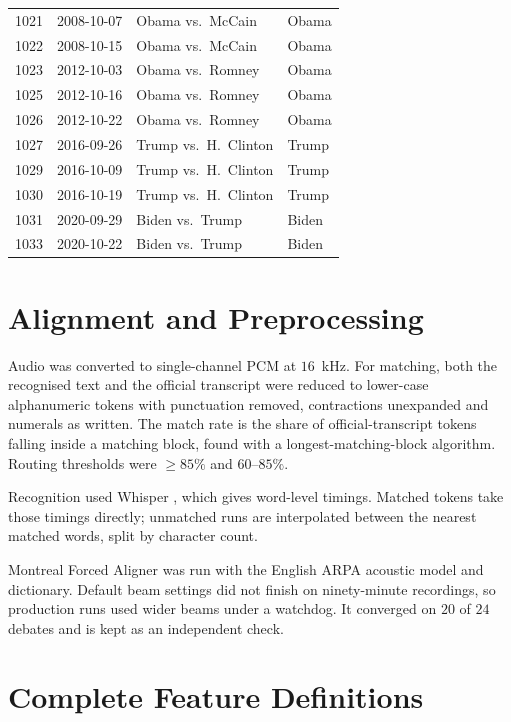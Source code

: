 \documentclass[journal]{IEEEtran}
\begin{document}
\begin{table}[h]
\begin{tabular}{llp{}l}
1021 & 2008-10-07 & Obama vs.\ McCain & Obama \\
1022 & 2008-10-15 & Obama vs.\ McCain & Obama \\
1023 & 2012-10-03 & Obama vs.\ Romney & Obama \\
1025 & 2012-10-16 & Obama vs.\ Romney & Obama \\
1026 & 2012-10-22 & Obama vs.\ Romney & Obama \\
1027 & 2016-09-26 & Trump vs.\ H.\ Clinton & Trump \\
1029 & 2016-10-09 & Trump vs.\ H.\ Clinton & Trump \\
1030 & 2016-10-19 & Trump vs.\ H.\ Clinton & Trump \\
1031 & 2020-09-29 & Biden vs.\ Trump & Biden \\
1033 & 2020-10-22 & Biden vs.\ Trump & Biden \\
\bottomrule
\end{tabular}
\end{table}

\section{Alignment and Preprocessing}
\label{app:align}

Audio was converted to single-channel PCM at $16$~kHz. For matching, both the
recognised text and the official transcript were reduced to lower-case
alphanumeric tokens with punctuation removed, contractions unexpanded and
numerals as written. The match rate is the share of official-transcript
tokens falling inside a matching block, found with a longest-matching-block
algorithm. Routing thresholds were $\geq 85\%$ and $60$--$85\%$.

Recognition used Whisper \cite{radford2023whisper}, which gives word-level
timings. Matched tokens take those timings directly; unmatched runs are
interpolated between the nearest matched words, split by character count.

Montreal Forced Aligner \cite{mcauliffe2017mfa} was run with the English ARPA
acoustic model and dictionary. Default beam settings did not finish on
ninety-minute recordings, so production runs used wider beams under a
watchdog. It converged on $20$ of $24$ debates and is kept as an independent
check.

\section{Complete Feature Definitions}
\label{app:features}
\label{app:tools}
\end{document}
